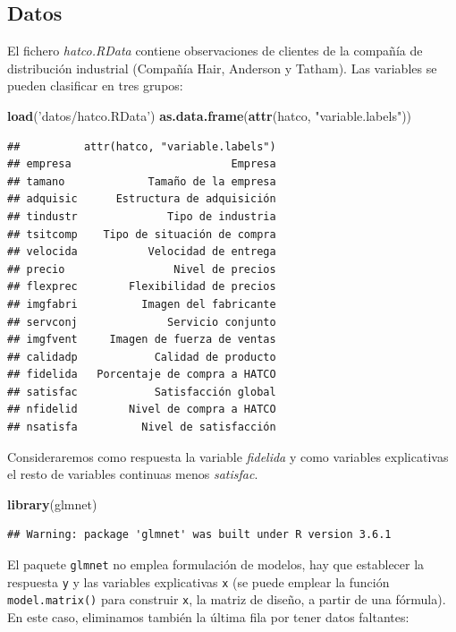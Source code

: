 \documentclass[]{book}
\newenvironment{Shaded}{\begin{snugshade}}{\end{snugshade}}
\newcommand{\KeywordTok}[1]{\textcolor[rgb]{0.13,0.29,0.53}{\textbf{#1}}}
\newcommand{\NormalTok}[1]{#1}
\newcommand{\StringTok}[1]{\textcolor[rgb]{0.31,0.60,0.02}{#1}}
\begin{document}
\hypertarget{datos}{%
\subsection{Datos}\label{datos}}

El fichero \emph{hatco.RData} contiene observaciones de clientes de la compañía de
distribución industrial (Compañía Hair, Anderson y Tatham).
Las variables se pueden clasificar en tres grupos:

\begin{Shaded}
\begin{Highlighting}[]
\KeywordTok{load}\NormalTok{(}\StringTok{'datos/hatco.RData'}\NormalTok{)}
\KeywordTok{as.data.frame}\NormalTok{(}\KeywordTok{attr}\NormalTok{(hatco, }\StringTok{"variable.labels"}\NormalTok{))}
\end{Highlighting}
\end{Shaded}

\begin{verbatim}
##          attr(hatco, "variable.labels")
## empresa                         Empresa
## tamano             Tamaño de la empresa
## adquisic      Estructura de adquisición
## tindustr              Tipo de industria
## tsitcomp    Tipo de situación de compra
## velocida           Velocidad de entrega
## precio                 Nivel de precios
## flexprec        Flexibilidad de precios
## imgfabri          Imagen del fabricante
## servconj              Servicio conjunto
## imgfvent     Imagen de fuerza de ventas
## calidadp            Calidad de producto
## fidelida   Porcentaje de compra a HATCO
## satisfac            Satisfacción global
## nfidelid        Nivel de compra a HATCO
## nsatisfa          Nivel de satisfacción
\end{verbatim}

Consideraremos como respuesta la variable \emph{fidelida} y como variables explicativas
el resto de variables continuas menos \emph{satisfac}.

\begin{Shaded}
\begin{Highlighting}[]
\KeywordTok{library}\NormalTok{(glmnet)}
\end{Highlighting}
\end{Shaded}

\begin{verbatim}
## Warning: package 'glmnet' was built under R version 3.6.1
\end{verbatim}

El paquete \texttt{glmnet} no emplea formulación de modelos, hay que establecer la respuesta
\texttt{y} y las variables explicativas \texttt{x} (se puede emplear la función \texttt{model.matrix()} para construir \texttt{x},
la matriz de diseño, a partir de una fórmula).
En este caso, eliminamos también la última fila por tener datos faltantes:
\end{document}
